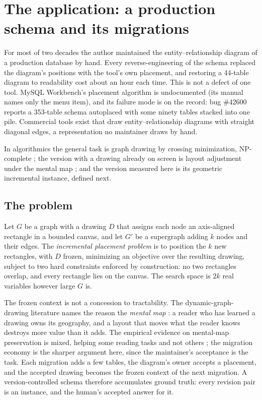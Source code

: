 \documentclass[11pt]{article}
\begin{document}
\section{The application: a production schema and its migrations}\label{sec:application}

For most of two decades the author maintained the entity--relationship diagram of a
production database by hand. Every reverse-engineering of the schema replaced the diagram's
positions with the tool's own placement, and restoring a 44-table diagram to readability
cost about an hour each time. This is not a defect of one tool. MySQL Workbench's placement
algorithm is undocumented (its manual names only the menu item), and its failure mode is on
the record: bug \#42600 reports a 353-table schema autoplaced with some ninety tables
stacked into one pile. Commercial tools exist that draw entity--relationship diagrams with
straight diagonal edges, a representation no maintainer draws by hand.

In algorithmics the general task is graph drawing by crossing minimization, NP-complete
\cite{gj83}; the version with a drawing already on screen is layout adjustment under the
mental map \cite{misue95}; and the version measured here is its geometric incremental
instance, defined next.

\subsection{The problem}\label{sec:problem}

Let $G$ be a graph with a drawing $D$ that assigns each node an axis-aligned rectangle in a
bounded canvas, and let $G'$ be a supergraph adding $k$ nodes and their edges. The
\emph{incremental placement problem} is to position the $k$ new rectangles, with $D$ frozen,
minimizing an objective over the resulting drawing, subject to two hard constraints enforced
by construction: no two rectangles overlap, and every rectangle lies on the canvas. The
search space is $2k$ real variables however large $G$ is.

The frozen context is not a concession to tractability. The dynamic-graph-drawing
literature names the reason the \emph{mental map} \cite{misue95}: a reader who has learned
a drawing owns its geography, and a layout that moves what the reader knows destroys more
value than it adds. The empirical evidence on mental-map preservation is mixed, helping
some reading tasks and not others \cite{archambault12}; the migration economy is the
sharper argument here, since the maintainer's acceptance is the task. Each migration adds a
few tables, the diagram's owner accepts a placement, and the accepted drawing becomes the
frozen context of the next migration. A version-controlled schema therefore accumulates
ground truth: every revision pair is an instance, and the human's accepted answer for it.
\end{document}
